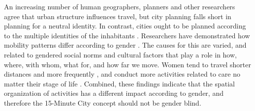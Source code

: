 \documentclass[
  authoryear,
  preprint,
  3p]{elsarticle}
\begin{document}
An increasing number of human geographers, planners and other
researchers agree that urban structure influences travel, but city
planning falls short in planning for a neutral identity. In contrast,
cities ought to be planned according to the multiple identities of the
inhabitants
\citep{vacchelli_towards_2018, urbandevelopmentviennaGenderMainstreamingUrban2013}.
Researchers have demonstrated how mobility patterns differ according to
gender
\citep{lawWomenTransportNew1999, cresswell_gendered_2008, levy2013travel, little_gender_1994, tronto_toward_1990}.
The causes for this are varied, and related to gendered social norms and
cultural factors that play a role in how, where, with whom, what for,
and how far we move. Women tend to travel shorter distances and more
frequently \citep{roorda_triap_2010, morency_distance_2011}, and conduct
more activities related to care no matter their stage of life
\citep{ilo_care_2018, garciaromanGenderDifferencesTime2022}. Combined,
these findings indicate that the spatial organization of activities has
a different impact according to gender, and therefore the 15-Minute City
concept should not be gender blind.
\end{document}
